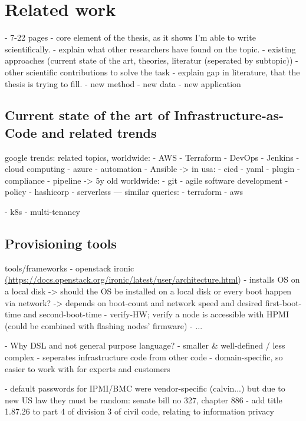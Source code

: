 \chapter{Related work}

- 7-22 pages
- core element of the thesis, as it shows I'm able to write scientifically.
- explain what other researchers have found on the topic.
  - existing approaches (current state of the art, theories, literatur (seperated by subtopic))
  - other scientific contributions to solve the task
- explain gap in literature, that the thesis is trying to fill.
  - new method
  - new data
  - new application




\section{Current state of the art of Infrastructure-as-Code and related trends} %
google trends: %
related topics, worldwide:
- AWS
- Terraform
- DevOps
- Jenkins
- cloud computing
- azure
- automation
- Ansible
-> in usa:
- cicd
- yaml
- plugin
- compliance
- pipeline
-> 5y old worldwide:
- git
- agile software development
- policy
- hashicorp
- serverless
---
similar queries:
- terraform
- aws


- k8s
- multi-tenancy


\section{Provisioning tools}


tools/frameworks
- openstack ironic \url{(https://docs.openstack.org/ironic/latest/user/architecture.html})
  - installs OS on a local disk
    -> should the OS be installed on a local disk or every boot happen via network?
      -> depends on boot-count and network speed and desired first-boot-time and second-boot-time
  - verify-HW; verify a node is accessible with HPMI (could be combined with flashing nodes' firmware)
- ...

- Why DSL and not general purpose language?
  - smaller & well-defined / less complex
  - seperates infrastructure code from other code
  - domain-specific, so easier to work with for experts and customers

- default passwords for IPMI/BMC were vendor-specific (calvin...) but due to new US law they must be random:
  senate bill no 327, chapter 886 - add title 1.87.26 to part 4 of division 3 of civil code, relating to information privacy

